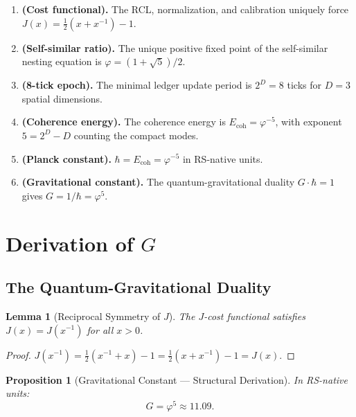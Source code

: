 \documentclass[12pt,a4paper]{article}
\newtheorem{lemma}[theorem]{Lemma}
\newtheorem{proposition}[theorem]{Proposition}
\theoremstyle{definition}
\theoremstyle{remark}
\begin{document}
\begin{enumerate}[label=\textbf{Step \arabic*},nosep,leftmargin=*]
  \item \textbf{(Cost functional).}  The RCL, normalization, and
  calibration uniquely force
  $J(x) = \tfrac{1}{2}(x + x^{-1}) - 1$.

  \item \textbf{(Self-similar ratio).}  The unique positive fixed
  point of the self-similar nesting equation is
  $\varphi = (1+\sqrt{5})/2$.

  \item \textbf{(8-tick epoch).}  The minimal ledger update period
  is $2^D = 8$ ticks for $D = 3$ spatial dimensions.

  \item \textbf{(Coherence energy).}  The coherence energy is
  $E_{\mathrm{coh}} = \varphi^{-5}$, with exponent
  $5 = 2^D - D$ counting the compact modes.

  \item \textbf{(Planck constant).}
  $\hbar = E_{\mathrm{coh}} = \varphi^{-5}$ in RS-native units.

  \item \textbf{(Gravitational constant).}  The quantum-gravitational
  duality $G \cdot \hbar = 1$ gives $G = 1/\hbar = \varphi^5$.
\end{enumerate}

\section{Derivation of $G$}
\label{sec:derivation}

\subsection{The Quantum-Gravitational Duality}

\begin{lemma}[Reciprocal Symmetry of $J$]
\label{lem:reciprocal}
The $J$-cost functional satisfies $J(x) = J(x^{-1})$ for all
$x > 0$.
\end{lemma}

\begin{proof}
$J(x^{-1}) = \frac{1}{2}(x^{-1} + x) - 1
= \frac{1}{2}(x + x^{-1}) - 1 = J(x)$.
\end{proof}

\begin{proposition}[Gravitational Constant --- Structural Derivation]
\label{thm:G}
In RS-native units:
\begin{equation}
  \boxed{G = \varphi^5 \approx 11.09.}
  \label{eq:G}
\end{equation}
\end{proposition}
\end{document}
